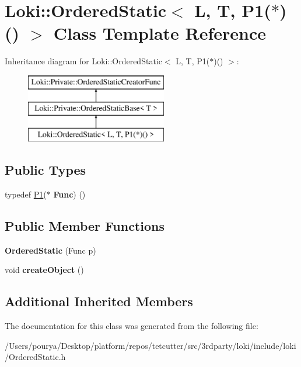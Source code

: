 \hypertarget{classLoki_1_1OrderedStatic_3_01L_00_01T_00_01P1_07_5_08_07_08_01_4}{}\section{Loki\+:\+:Ordered\+Static$<$ L, T, P1($\ast$)() $>$ Class Template Reference}
\label{classLoki_1_1OrderedStatic_3_01L_00_01T_00_01P1_07_5_08_07_08_01_4}
Inheritance diagram for Loki\+:\+:Ordered\+Static$<$ L, T, P1($\ast$)() $>$\+:\begin{figure}[H]
\begin{center}
\leavevmode
\includegraphics[height=3.000000cm]{classLoki_1_1OrderedStatic_3_01L_00_01T_00_01P1_07_5_08_07_08_01_4}
\end{center}
\end{figure}
\subsection*{Public Types}
\begin{DoxyCompactItemize}
\item 
\hypertarget{classLoki_1_1OrderedStatic_3_01L_00_01T_00_01P1_07_5_08_07_08_01_4_aa267062bad1e1127a7fa5ce8812d753e}{}typedef \hyperlink{structP1}{P1}($\ast$ {\bfseries Func}) ()\label{classLoki_1_1OrderedStatic_3_01L_00_01T_00_01P1_07_5_08_07_08_01_4_aa267062bad1e1127a7fa5ce8812d753e}

\end{DoxyCompactItemize}
\subsection*{Public Member Functions}
\begin{DoxyCompactItemize}
\item 
\hypertarget{classLoki_1_1OrderedStatic_3_01L_00_01T_00_01P1_07_5_08_07_08_01_4_a8fadfc6ce33d743fde7cc497e3944684}{}{\bfseries Ordered\+Static} (Func p)\label{classLoki_1_1OrderedStatic_3_01L_00_01T_00_01P1_07_5_08_07_08_01_4_a8fadfc6ce33d743fde7cc497e3944684}

\item 
\hypertarget{classLoki_1_1OrderedStatic_3_01L_00_01T_00_01P1_07_5_08_07_08_01_4_a34ec270f7739023a026aadcb4f8a808e}{}void {\bfseries create\+Object} ()\label{classLoki_1_1OrderedStatic_3_01L_00_01T_00_01P1_07_5_08_07_08_01_4_a34ec270f7739023a026aadcb4f8a808e}

\end{DoxyCompactItemize}
\subsection*{Additional Inherited Members}


The documentation for this class was generated from the following file\+:\begin{DoxyCompactItemize}
\item 
/\+Users/pourya/\+Desktop/platform/repos/tetcutter/src/3rdparty/loki/include/loki/Ordered\+Static.\+h\end{DoxyCompactItemize}
